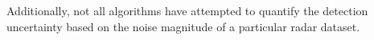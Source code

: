 Additionally, not all algorithms have attempted to quantify the detection uncertainty based on the noise magnitude of a particular radar dataset. 




%
%
%
%
%




